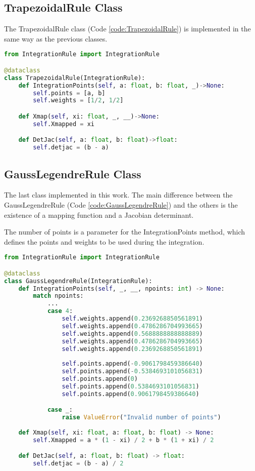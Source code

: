 \subsection{TrapezoidalRule Class}
The TrapezoidalRule class (Code \ref{code:TrapezoidalRule}) is implemented in the same way as the previous classes.
\begin{lstlisting}[language=python, caption={TrapezoidalRule Class.}, label={code:TrapezoidalRule}]
from IntegrationRule import IntegrationRule

@dataclass
class TrapezoidalRule(IntegrationRule):
    def IntegrationPoints(self, a: float, b: float, _)->None:
        self.points = [a, b]
        self.weights = [1/2, 1/2]

    def Xmap(self, xi: float, _, __)->None:
        self.Xmapped = xi

    def DetJac(self, a: float, b: float)->float:
        self.detjac = (b - a)
\end{lstlisting}

\subsection{GaussLegendreRule Class}
The last class implemented in this work. The main difference between the GaussLegendreRule (Code \ref{code:GaussLegendreRule}) and the others is the existence of a mapping function and a Jacobian determinant. 

The number of points is a parameter for the IntegrationPoints method, which defines the points and weights to be used during the integration.
\begin{lstlisting}[language=python, caption={GaussLegendreRule Class.}, label={code:GaussLegendreRule}]
from IntegrationRule import IntegrationRule

@dataclass
class GaussLegendreRule(IntegrationRule):
    def IntegrationPoints(self, _, __, npoints: int) -> None:
        match npoints:
            ...
            case 4:
                self.weights.append(0.2369268850561891)
                self.weights.append(0.4786286704993665)
                self.weights.append(0.5688888888888889)
                self.weights.append(0.4786286704993665)
                self.weights.append(0.2369268850561891)
                
                self.points.append(-0.9061798459386640)
                self.points.append(-0.5384693101056831)
                self.points.append(0)
                self.points.append(0.5384693101056831)
                self.points.append(0.9061798459386640)

            case _:
                raise ValueError("Invalid number of points")
            
    def Xmap(self, xi: float, a: float, b: float) -> None:
        self.Xmapped = a * (1 - xi) / 2 + b * (1 + xi) / 2

    def DetJac(self, a: float, b: float) -> float:
        self.detjac = (b - a) / 2
\end{lstlisting}

